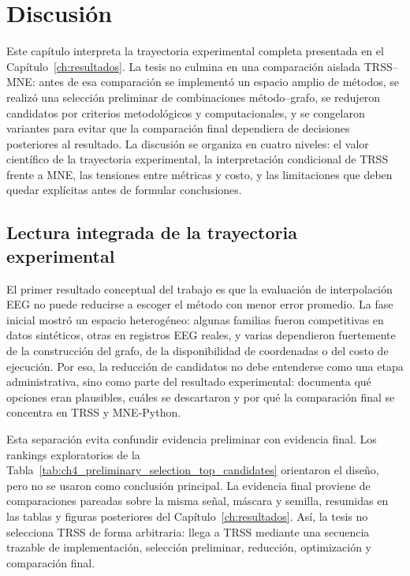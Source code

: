 \chapter{Discusión}
\label{ch:discusion}

Este capítulo interpreta la trayectoria experimental completa presentada en el Capítulo~\ref{ch:resultados}. La tesis no culmina en una comparación aislada TRSS--MNE: antes de esa comparación se implementó un espacio amplio de métodos, se realizó una selección preliminar de combinaciones método--grafo, se redujeron candidatos por criterios metodológicos y computacionales, y se congelaron variantes para evitar que la comparación final dependiera de decisiones posteriores al resultado. La discusión se organiza en cuatro niveles: el valor científico de la trayectoria experimental, la interpretación condicional de TRSS frente a MNE, las tensiones entre métricas y costo, y las limitaciones que deben quedar explícitas antes de formular conclusiones.

\section{Lectura integrada de la trayectoria experimental}

El primer resultado conceptual del trabajo es que la evaluación de interpolación EEG no puede reducirse a escoger el método con menor error promedio. La fase inicial mostró un espacio heterogéneo: algunas familias fueron competitivas en datos sintéticos, otras en registros EEG reales, y varias dependieron fuertemente de la construcción del grafo, de la disponibilidad de coordenadas o del costo de ejecución. Por eso, la reducción de candidatos no debe entenderse como una etapa administrativa, sino como parte del resultado experimental: documenta qué opciones eran plausibles, cuáles se descartaron y por qué la comparación final se concentra en TRSS y MNE-Python.

Esta separación evita confundir evidencia preliminar con evidencia final. Los rankings exploratorios de la Tabla~\ref{tab:ch4_preliminary_selection_top_candidates} orientaron el diseño, pero no se usaron como conclusión principal. La evidencia final proviene de comparaciones pareadas sobre la misma señal, máscara y semilla, resumidas en las tablas y figuras posteriores del Capítulo~\ref{ch:resultados}. Así, la tesis no selecciona TRSS de forma arbitraria: llega a TRSS mediante una secuencia trazable de implementación, selección preliminar, reducción, optimización y comparación final.

